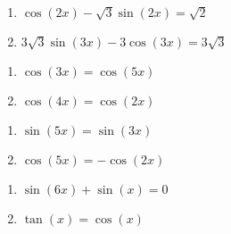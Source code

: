 \begin{multicols}{2}

\begin{enumerate}

\setcounter{enumi}{\value{HW}}

\item $\cos(2x) - \sqrt{3} \sin(2x) = \sqrt{2}$
\item $3\sqrt{3}\sin(3x) - 3\cos(3x) = 3\sqrt{3}$

\setcounter{HW}{\value{enumi}}

\end{enumerate}

\end{multicols}

\begin{multicols}{2}

\begin{enumerate}

\setcounter{enumi}{\value{HW}}

\item  $\cos(3x) = \cos(5x)$
\item $\cos(4x) = \cos(2x)$

\setcounter{HW}{\value{enumi}}

\end{enumerate}

\end{multicols}

\begin{multicols}{2}

\begin{enumerate}

\setcounter{enumi}{\value{HW}}

\item $\sin(5x) = \sin(3x)$
\item $\cos(5x) = -\cos(2x)$

\setcounter{HW}{\value{enumi}}

\end{enumerate}

\end{multicols}

\begin{multicols}{2}

\begin{enumerate}

\setcounter{enumi}{\value{HW}}

\item $\sin(6x) + \sin(x) = 0$
\item $\tan(x) = \cos(x)$ \label{solvemoreidentlast}

\setcounter{HW}{\value{enumi}}

\end{enumerate}

\end{multicols}

